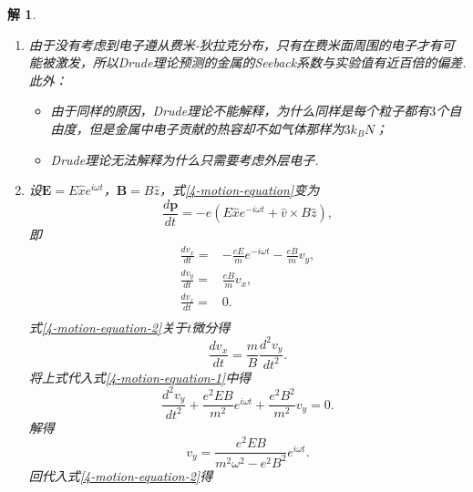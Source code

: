 \documentclass[UTF8,10pt,a4paper]{article}
\theoremstyle{Problem}
\theoremstyle{Solution}
\newtheorem*{sol}{解}
\begin{document}
\begin{sol}
\begin{enumerate}
\begin{itemize}
\begin{itemize}
                \item 电场方向存在偏差，从而导致即使在不施加磁场的情况下也能测得不等于零的电压：完成一次测量后，将磁场反向，再次测量，取两次测得电压大小的平均值.
            \end{itemize}
        \end{itemize}
        \item[(d)] 由于没有考虑到电子遵从费米-狄拉克分布，只有在费米面周围的电子才有可能被激发，所以Drude理论预测的金属的Seeback系数与实验值有近百倍的偏差. 此外：
        \begin{itemize}
            \item 由于同样的原因，Drude理论不能解释，为什么同样是每个粒子都有$3$个自由度，但是金属中电子贡献的热容却不如气体那样为$3k_BN$；
            \item Drude理论无法解释为什么只需要考虑外层电子.
        \end{itemize}
        \item[(e)] 设$\bm{E}=E\hat{x}e^{i\omega t}$，$\bm{B}=B\hat{z}$，式\eqref{4-motion-equation}变为
        \begin{equation}
            \frac{d\bm{p}}{dt}=-e(E\hat{x}e^{-i\omega t}+\hat{v}\times B\hat{z}),
        \end{equation}
        即
        \begin{align}
            \label{4-motion-equation-1}\frac{dv_x}{dt}=&-\frac{eE}{m}e^{-i\omega t}-\frac{eB}{m}v_y,\\
            \label{4-motion-equation-2}\frac{dv_y}{dt}=&\frac{eB}{m}v_x,\\
            \label{4-motion-equation-3}\frac{dv_z}{dt}=&0.\\
        \end{align}
        式\eqref{4-motion-equation-2}关于$t$微分得
        \begin{equation}
            \frac{dv_x}{dt}=\frac{m}{B}\frac{d^2v_y}{dt^2}.
        \end{equation}
        将上式代入式\eqref{4-motion-equation-1}中得
        \begin{equation}
            \frac{d^2v_y}{dt^2}+\frac{e^2EB}{m^2}e^{i\omega t}+\frac{e^2B^2}{m^2}v_y=0.
        \end{equation}
        解得
        \begin{equation}
            v_y=\frac{e^2EB}{m^2\omega^2-e^2B^2}e^{i\omega t}.
        \end{equation}
        回代入式\eqref{4-motion-equation-2}得
        \begin{equation}

\end{equation}
\end{enumerate}
\end{sol}
\end{document}
